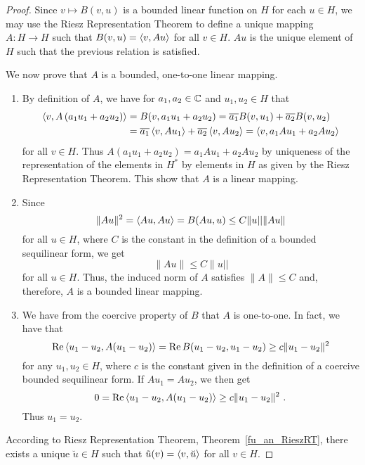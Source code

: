 \begin{proof}
 Since $v \mapsto B(v,u)$ is a bounded linear function on
$H$ for each $u\in H$, we may use the Riesz Representation Theorem
to define a unique mapping $A:H \rightarrow H$ such that
$\displaystyle B(v,u) = \left\langle{v} , {Au}\right\rangle$ for all $v \in H$.
$Au$ is the unique element of $H$ such that the previous relation is
satisfied.

We now prove that $A$ is a bounded, one-to-one linear mapping.
\begin{enumerate}
\item By definition of $A$, we have for $a_1, a_2 \in \mathbb{C}$ and
$u_1, u_2 \in H$ that
\begin{align*}
\left\langle{v} , {A\left( a_1 u_1 + a_2 u_2 \right)}\right\rangle
&= B(v,a_1 u_1 + a_2 u_2) = \overline{a_1} B(v,u_1) + \overline{a_2} B(v,u_2) \\
&= \overline{a_1} \left\langle{v} , {A u_1}\right\rangle + \overline{a_2} \left\langle{v} , {A u_2}\right\rangle
= \left\langle{v} , {a_1 A u_1 + a_2 A u_2}\right\rangle
\end{align*}
for all $v \in H$.  Thus
$A\left( a_1 u_1 + a_2 u_2 \right) = a_1 A u_1 + a_2 A u_2$ by
uniqueness of the representation of the elements in $\displaystyle H^\ast$ by
elements in $H$ as given by the Riesz Representation Theorem.  This
show that $A$ is a linear mapping.
\item Since
\[
\|Au\|^2 = \left\langle{Au} , {Au}\right\rangle = B(Au,u) \leq C \|u||\|Au\|
\]
for all $u \in H$, where $C$ is the constant in the definition of a
bounded sequilinear form, we get
\begin{equation} \label{fu_an_lax6}
\|Au\| \leq C \|u||
\end{equation}
for all $u \in H$.  Thus, the induced norm of $A$ satisfies
$\|A\| \leq C$ and, therefore, $A$ is a bounded linear mapping.
\item We have from the coercive property of $B$ that $A$ is
one-to-one.  In fact, we have that
\begin{equation} \label{fu_an_lax7}
\operatorname{Re} \left\langle{u_1-u_2} , {A(u_1-u_2)}\right\rangle
= \operatorname{Re} B(u_1-u_2,u_1-u_2) \geq c \|u_1-u_2\|^2
\end{equation}
for any $u_1, u_2 \in H$, where $c$ is the constant given in the
definition of a coercive bounded sequilinear form.
If $A u_1 = A u_2$, we then get
\[
0 = \operatorname{Re} \left\langle{u_1-u_2} , {A(u_1-u_2)}\right\rangle \geq c \|u_1-u_2\|^2 \ .
\]
Thus $u_1=u_2$.
\end{enumerate}

 According to Riesz Representation Theorem,
Theorem~\ref{fu_an_RieszRT}, there exists a unique $\breve{u} \in H$ such that 
$\displaystyle \tilde{u}(v) = \left\langle{v} , {\breve{u}}\right\rangle$ for all $v \in H$.


\end{proof}
